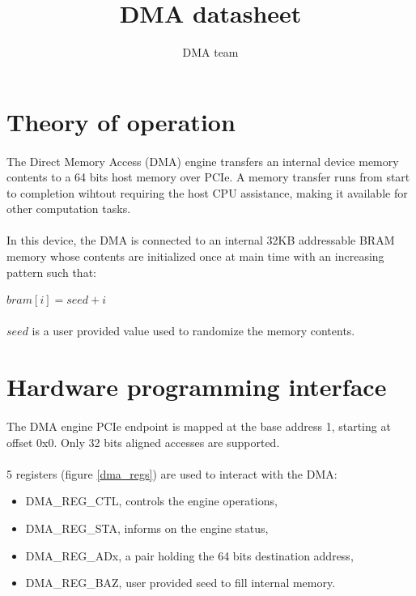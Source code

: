 \documentclass[a4paper, 11pt]{article}
\begin{document}
\title{DMA datasheet}
\author{DMA team}
\date{}

\maketitle

\newpage
\tableofcontents
{}


\newpage
\section{Theory of operation}
\paragraph{}
The Direct Memory Access (DMA) engine transfers an internal device memory
contents to a 64 bits host memory over PCIe. A memory transfer runs from
start to completion wihtout requiring the host CPU assistance, making it
available for other computation tasks.
\paragraph{}
In this device, the DMA is connected to an internal 32KB addressable BRAM
memory whose contents are initialized once at main time with an increasing
pattern such that:
\begin{center}$bram[i] = seed + i$\end{center}
\paragraph{}
$seed$ is a user provided value used to randomize the memory contents.


\newpage
\section{Hardware programming interface}
\paragraph{}
The DMA engine PCIe endpoint is mapped at the base address 1, starting at
offset 0x0. Only 32 bits aligned accesses are supported.
\paragraph{}
5 registers (figure \ref{dma_regs}) are used to interact with the DMA:
\begin{itemize}
\item DMA\_REG\_CTL, controls the engine operations,
\item DMA\_REG\_STA, informs on the engine status,
\item DMA\_REG\_ADx, a pair holding the 64 bits destination address,
\item DMA\_REG\_BAZ, user provided seed to fill internal memory.
\end{itemize}
\end{document}
